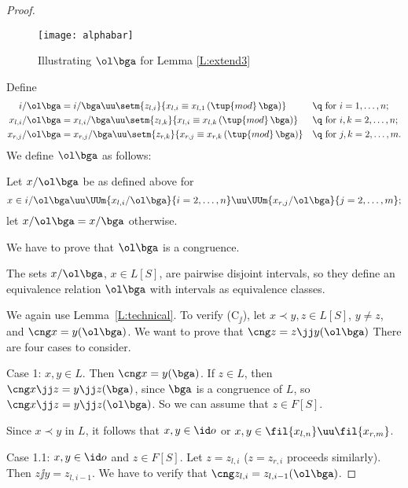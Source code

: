 \documentclass{amsart}
\theoremstyle{plain}
\theoremstyle{definition}
\begin{document}
\begin{proof}

\begin{figure}[tbh]
  \centerline{\texttt{[image: alphabar]}}
  \caption{Illustrating ${\ol \bga}$ for Lemma \ref{L:extend3}}\label{F:alphabar}
\end{figure}

Define 
\begin{align}
   i/{\ol \bga} &= i/\bga \uu \setm{z_{l,i}}
               {x_{l,i} \equiv x_{l,1}\,(\tup{mod}\,\bga)}
                &&\text{\q for $i = 1, \dots, n$};\label{E:i}\\
   x_{l,i}/{\ol \bga} &=  x_{l,i}/\bga \uu \setm{z_{l,k}}
               {x_{l,i} \equiv x_{l,k}\,(\tup{mod}\,\bga)}
                      &&\text{\q for $i,k = 2, \dots, n$};\label{E:ii}\\
  x_{r,j}/{\ol \bga} &= x_{r,j}/\bga \uu \setm{z_{r,k}}
                  {x_{r,j} \equiv x_{r,k}\,(\tup{mod}\,\bga)}
               &&\text{\q for $j,k = 2, \dots, m$}\label{E:iii}.
\end{align}
We define ${\ol \bga}$ as follows: 

Let $x/{\ol \bga}$ be as defined above for 
\[
   x \in i/{\ol \bga} \uu \UUm{x_{l,i}/{\ol \bga}}{i = 2, \dots, n} 
      \uu \UUm{x_{r,j}/{\ol \bga}}{j = 2, \dots, m};
\]
let $x/{\ol \bga} = x/\bga$ otherwise.

We have to prove that ${\ol \bga}$ is a congruence. 

The sets $x/{\ol \bga}$, $x \in L[S]$, 
are pairwise disjoint intervals, 
so they define an equivalence relation ${\ol \bga}$ 
with intervals as equivalence classes.

We again use Lemma~\ref{L:technical}.
To verify (C${}_\jj$), let $x \prec y,z \in L[S]$, $y \neq z$, 
and $\cng x = y ({\ol \bga})$. We want to prove that $\cng z = z \jj y ({\ol \bga})$
There are four cases to consider.

Case 1: $x, y \in L$. Then $\cng x=y(\bga)$.
If $z \in L$, then $\cng x \jj z =y\jj z(\bga)$, since $\bga$ is a congruence of $L$, 
so $\cng x \jj z =y\jj z({\ol \bga})$. So we can assume that $z \in F[S]$. 

Since $x \prec y$ in $L$, it follows that $x, y \in \id o$ 
or $x, y \in \fil {x_{l,n}} \uu \fil {x_{r,m}}$.

\q Case 1.1: $x, y \in \id o$ and $z \in F[S]$. 
Let $z = z_{l,i}$ ($z = z_{r,i}$ proceeds similarly). 
Then $z \jj y = z_{l,i-1}$.
We have to verify that $\cng z_{l,i} = z_{l,i-1} ({\ol \bga})$.


\end{proof}
\end{document}
